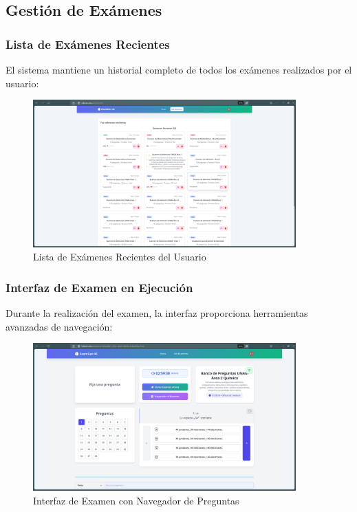 \documentclass[12pt,a4paper]{report}
\begin{document}
\subsection{Gestión de Exámenes}

\subsubsection{Lista de Exámenes Recientes}
El sistema mantiene un historial completo de todos los exámenes realizados por el usuario:

\begin{figure}[h]
\centering
\includegraphics[width=0.9\textwidth]{250617_06h46m40s_screenshot.png}
\caption{Lista de Exámenes Recientes del Usuario}
\label{fig:examenes_recientes}
\end{figure}

\subsubsection{Interfaz de Examen en Ejecución}
Durante la realización del examen, la interfaz proporciona herramientas avanzadas de navegación:

\begin{figure}[h]
\centering
\includegraphics[width=0.9\textwidth]{250617_06h47m02s_screenshot.png}
\caption{Interfaz de Examen con Navegador de Preguntas}
\label{fig:examen_navegacion}
\end{figure}
\end{document}
